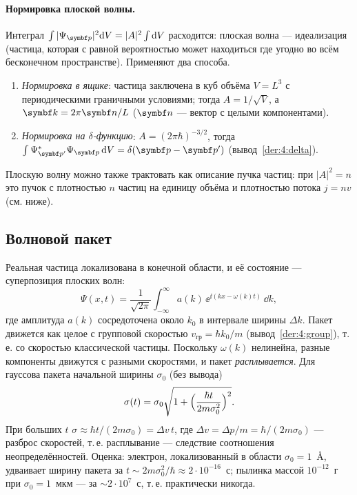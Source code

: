 \paragraph{Нормировка плоской волны.} Интеграл $\int|\Psi_{\vect p}|^2\dd V=|A|^2\int\dd V$
расходится: плоская волна — идеализация (частица, которая с равной вероятностью может
находиться где угодно во всём бесконечном пространстве). Применяют два способа.
\begin{enumerate}
 \item \emph{Нормировка в ящике}: частица заключена в куб объёма $V=L^3$ с периодическими
       граничными условиями; тогда $A=1/\sqrt V$, а $\vect k=2\pi\vect n/L$ ($\vect n$ —
       вектор с целыми компонентами).
 \item \emph{Нормировка на $\delta$-функцию}: $A=(2\pi\hbar)^{-3/2}$, тогда
       $\int\Psi_{\vect p'}^*\Psi_{\vect p}\,\dd V=\delta(\vect p-\vect p')$ (вывод~\ref{der:4:delta}).
\end{enumerate}
Плоскую волну можно также трактовать как описание пучка частиц: при $|A|^2=n$ это пучок с
плотностью $n$ частиц на единицу объёма и плотностью потока $j=nv$ (см. ниже).

\subsection{Волновой пакет}

Реальная частица локализована в конечной области, и её состояние — суперпозиция плоских волн:
\begin{equation}\label{eq:4:packet}
  \Psi(x,t)=\frac{1}{\sqrt{2\pi}}\int_{-\infty}^{\infty}a(k)\,\ee^{\ii(kx-\omega(k)t)}\,\dd k ,
\end{equation}
где амплитуда $a(k)$ сосредоточена около $k_0$ в интервале ширины $\Delta k$. Пакет движется
как целое с групповой скоростью $v_{\text{гр}}=\hbar k_0/m$ (вывод~\ref{der:4:group}), т.\,е. со
скоростью классической частицы. Поскольку $\omega(k)$ нелинейна, разные компоненты движутся с
разными скоростями, и пакет \emph{расплывается}. Для гауссова пакета начальной ширины $\sigma_0$
(без вывода)
\begin{equation}\label{eq:4:spread}
  \sigma(t)=\sigma_0\sqrt{1+\Bigl(\frac{\hbar t}{2m\sigma_0^2}\Bigr)^2}.
\end{equation}
При больших $t$ $\sigma\approx\hbar t/(2m\sigma_0)=\Delta v\,t$, где $\Delta v=\Delta p/m=\hbar/(2m\sigma_0)$ —
разброс скоростей, т.\,е. расплывание — следствие соотношения неопределённостей. Оценка:
электрон, локализованный в области $\sigma_0=1$~Å, удваивает ширину пакета за
$t\sim2m\sigma_0^2/\hbar\approx2\cdot10^{-16}$~с; пылинка массой $10^{-12}$~г при
$\sigma_0=1$~мкм — за $\sim2\cdot10^{7}$~с, т.\,е. практически никогда.

